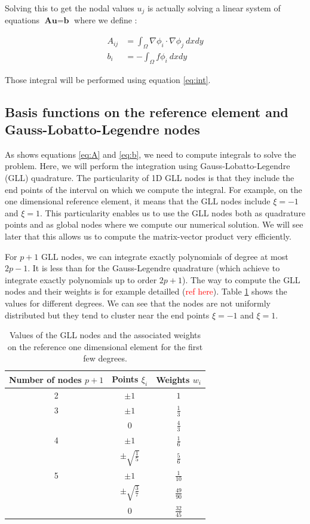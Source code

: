Solving this to get the nodal values $u_j$ is actually solving a linear system of equations $\textbf{Au}=\textbf{b}$ where we define : 

\begin{align}
A_{ij} &= \int_\Omega \nabla \phi_i \cdot \nabla \phi_j \:dxdy \label{eq:A}\\
b_i &= -\int_\Omega f\phi_i \:dxdy \label{eq:b}
\end{align}

Those integral will be performed using equation \ref{eq:int}.

\subsection{Basis functions on the reference element and Gauss-Lobatto-Legendre nodes}

As shows equations \ref{eq:A} and \ref{eq:b}, we need to compute integrals to solve the problem. Here, we will perform the integration using Gauss-Lobatto-Legendre (GLL) quadrature. The particularity of 1D GLL nodes is that they include the end points of the interval on which we compute the integral. For example, on the one dimensional reference element, it means that the GLL nodes include $\xi = -1$ and $\xi=1$. This particularity enables us to use the GLL nodes both as quadrature points and as global nodes where we compute our numerical solution. We will see later that this allows us to compute the matrix-vector product very efficiently. 

For $p+1$ GLL nodes, we can integrate exactly polynomials of degree at most $2p-1$. It is less than for the Gauss-Legendre quadrature (which achieve to integrate exactly polynomials up to order $2p+1$). The way to compute the GLL nodes and their weights is for example detailled (\textcolor{red}{ref here}). Table \ref{gll_values} shows the values for different degrees. We can see that the nodes are not uniformly distributed but they tend to cluster near the end points $\xi = -1$ and $\xi=1$.

\begin{table}
\centering
\begin{tabular}{c|cc}
\hline
 Number of nodes $p+1$ & Points $\xi_i$ & Weights $w_i$\\
 \hline
 2 & $\pm 1$ & $1$ \\
 \hline
 3 & $\pm 1$ & $\frac{1}{3}$\\
    & 0			   & $\frac{4}{3}$\\
 \hline
 4 & $\pm 1$ & $\frac{1}{6}$\\
    & $\pm \sqrt{\frac{1}{5}}$  & $\frac{5}{6}$\\
\hline
5 & $\pm 1$ & $\frac{1}{10}$\\
   & $\pm \sqrt{\frac{3}{7}}$ & $\frac{49}{90}$\\
   & $0$ & $\frac{32}{45}$\\
   \hline
\end{tabular}
\caption{Values of the GLL nodes and the associated weights on the reference one dimensional element for the first few degrees.}
\label{gll_values}
\end{table}

